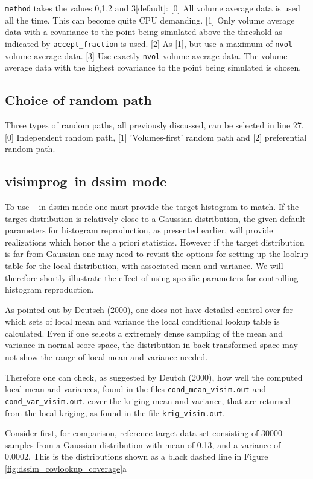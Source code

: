 \documentclass[12t]{article}
\begin{document}
\texttt{method} takes the values 0,1,2 and 3[default]:
[0] All volume average data is used all the time. This can become quite CPU demanding.
[1] Only volume average data with a covariance to the point being
simulated above the threshold as indicated by
\texttt{accept\_fraction} is used. 
[2] As [1], but use a maximum of \texttt{nvol} volume average data.
[3] Use exactly \texttt{nvol} volume average data. The volume average data with the highest covariance to the point being simulated is chosen.

\subsection{Choice of random path} 
Three types of random paths, all previously discussed, can be selected in line 27. [0] Independent random path, [1] 'Volumes-first' random path and [2] preferential random path. 


\subsection{visimprog~in dssim mode}
To use \visimprog~ in dssim mode one must provide the target
histogram to match. If the target distribution is relatively close to
a Gaussian distribution, the given default parameters for histogram reproduction, as presented
earlier, will provide realizations which honor the a priori statistics. 
However if the target distribution is far from Gaussian one may need
to revisit the options for setting up the lookup table for the local
distribution, with associated mean and variance. We will therefore shortly illustrate the effect of using specific parameters for controlling histogram reproduction.

As pointed out by Deutsch (2000), one does not have detailed control
over for which sets of local mean and variance the local conditional lookup
table is calculated. Even if one selects a extremely dense sampling of
the mean and variance in normal score space, the distribution in
back-transformed space may not show the range of local mean and variance needed. 

Therefore one can check, as suggested by Deutch (2000), how well the computed local mean and
variances, found in the files \texttt{cond\_mean\_visim.out} and 
\texttt{cond\_var\_visim.out}.
cover the kriging mean and variance, that are returned from the local
kriging, as found in the file \texttt{krig\_visim.out}.

Consider first, for comparison, reference target data set consisting of  30000 samples
from a Gaussian distribution with mean of 0.13, and a variance of
0.0002. This is the distributions shown as a black dashed line in Figure \ref{fig:dssim_covlookup_coverage}a  
\end{document}
